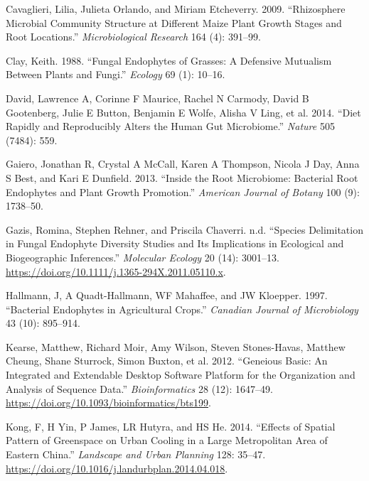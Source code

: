 \documentclass[fleqn,10pt,lineno]{wlpeerj} %
\newlength{\cslhangindent}
\newenvironment{CSLReferences}[2] %
 {%
  \setlength{\parindent}{0pt}
  \ifodd #1 \everypar{\setlength{\hangindent}{\cslhangindent}}\ignorespaces\fi
  \ifnum #2 > 0
  \setlength{\parskip}{#2\baselineskip}
  \fi
 }%
 {}
\begin{document}
\begin{CSLReferences}{1}{0}
\leavevmode{}%
Cavaglieri, Lilia, Julieta Orlando, and Miriam Etcheverry. 2009. {``Rhizosphere Microbial Community Structure at Different Maize Plant Growth Stages and Root Locations.''} \emph{Microbiological Research} 164 (4): 391--99.

\leavevmode{}%
Clay, Keith. 1988. {``Fungal Endophytes of Grasses: A Defensive Mutualism Between Plants and Fungi.''} \emph{Ecology} 69 (1): 10--16.

\leavevmode{}%
David, Lawrence A, Corinne F Maurice, Rachel N Carmody, David B Gootenberg, Julie E Button, Benjamin E Wolfe, Alisha V Ling, et al. 2014. {``Diet Rapidly and Reproducibly Alters the Human Gut Microbiome.''} \emph{Nature} 505 (7484): 559.

\leavevmode{}%
Gaiero, Jonathan R, Crystal A McCall, Karen A Thompson, Nicola J Day, Anna S Best, and Kari E Dunfield. 2013. {``Inside the Root Microbiome: Bacterial Root Endophytes and Plant Growth Promotion.''} \emph{American Journal of Botany} 100 (9): 1738--50.

\leavevmode{}%
Gazis, Romina, Stephen Rehner, and Priscila Chaverri. n.d. {``Species Delimitation in Fungal Endophyte Diversity Studies and Its Implications in Ecological and Biogeographic Inferences.''} \emph{Molecular Ecology} 20 (14): 3001--13. \url{https://doi.org/10.1111/j.1365-294X.2011.05110.x}.

\leavevmode{}%
Hallmann, J, A Quadt-Hallmann, WF Mahaffee, and JW Kloepper. 1997. {``Bacterial Endophytes in Agricultural Crops.''} \emph{Canadian Journal of Microbiology} 43 (10): 895--914.

\leavevmode{}%
Kearse, Matthew, Richard Moir, Amy Wilson, Steven Stones-Havas, Matthew Cheung, Shane Sturrock, Simon Buxton, et al. 2012. {``Geneious Basic: An Integrated and Extendable Desktop Software Platform for the Organization and Analysis of Sequence Data.''} \emph{Bioinformatics} 28 (12): 1647--49. \url{https://doi.org/10.1093/bioinformatics/bts199}.

\leavevmode{}%
Kong, F, H Yin, P James, LR Hutyra, and HS He. 2014. {``Effects of Spatial Pattern of Greenspace on Urban Cooling in a Large Metropolitan Area of Eastern China.''} \emph{Landscape and Urban Planning} 128: 35--47. \url{https://doi.org/10.1016/j.landurbplan.2014.04.018}.


\end{CSLReferences}
\end{document}
